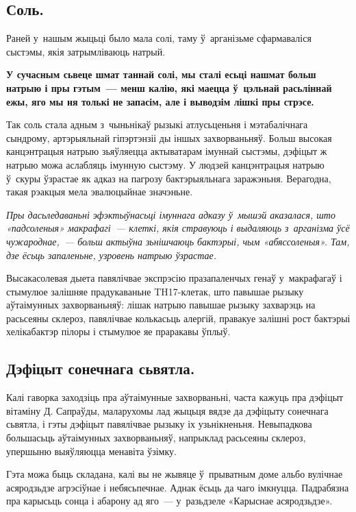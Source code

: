 \subsection*{Соль.}

Раней у~нашым жыцьці было мала солі, таму ў~арганізьме сфармаваліся сыстэмы, якія затрымліваюць натрый. 

\textbf{У сучасным сьвеце шмат таннай солі, мы сталі есьці нашмат больш натрыю і пры гэтым~--- менш калію, які маецца ў~цэльнай расьліннай ежы, яго мы ня толькі не запасім, але і выводзім лішкі пры стрэсе.}

Так соль стала адным з~чыньнікаў рызыкі атлусьценьня і мэтабалічнага сындрому, артэрыяльнай гіпэртэнзіі ды іншых захворваньняў. Больш высокая канцэнтрацыя натрыю зьяўляецца актыватарам імуннай сыстэмы, дэфіцыт ж натрыю можа аслабляць імунную сыстэму. У людзей канцэнтрацыя натрыю ў~скуры ўзрастае як адказ на пагрозу бактэрыяльнага заражэньня. Верагодна, такая рэакцыя мела эвалюцыйнае значэньне.

\emph{Пры дасьледаваньні эфэктыўнасьці імуннага адказу ў~мышэй аказалася, што «падсоленыя» макрафагі~--- клеткі, якія стравуюць і выдаляюць з~арганізма ўсё чужароднае,~--- больш актыўна зьнішчаюць бактэрыі, чым «абяссоленыя». Там, дзе ёсьць запаленьне, узровень натрыю ўзрастае.}

Высакасолевая дыета павялічвае экспрэсію празапаленчых генаў у~макрафагаў і стымулюе залішняе прадукаваньне TH17-клетак, што павышае рызыку аўтаімунных захворваньняў: лішак натрыю павышае рызыку захварэць на расьсеяны склероз, павялічвае колькасьць алергій, правакуе залішні рост бактэрыі хелікабактэр пілоры і стымулюе яе праракавы ўплыў.

\subsection*{Дэфіцыт сонечнага сьвятла.}

Калі гаворка заходзіць пра аўтаімунные захворваньні, часта кажуць пра дэфіцыт вітаміну Д. Сапраўды, маларухомы лад жыцьця вядзе да дэфіцыту сонечнага сьвятла, і гэты дэфіцыт павялічвае рызыку іх узьнікненьня. Невыпадкова большасьць аўтаімунных захворваньняў, напрыклад расьсеяны склероз, упершыню выяўляюцца менавіта ўзімку. 


Гэта можа быць складана, калі вы не жывяце ў~прыватным доме альбо вулічнае асяродзьдзе агрэсіўнае і небясьпечнае. Аднак ёсьць да чаго імкнуцца. Падрабязна пра карысьць сонца і абарону ад яго~--- у~разьдзеле «Карыснае асяродзьдзе».

